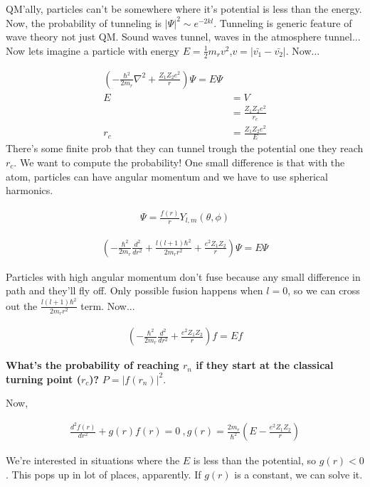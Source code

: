 \documentclass[10pt,letterpaper,final]{book}
\begin{document}
QM'ally, particles can't be somewhere where it's potential is less than the energy. Now, the probability of tunneling is $|\Psi|^2 \sim e^{-2kl}$. Tunneling is generic feature of wave theory not just QM. Sound waves tunnel, waves in the atmosphere tunnel...\\
Now lets imagine a particle with energy $E = \frac{1}{2}m_r v^2$,$v = | \bar{v_1} - \bar{v_2} |$. Now...

\begin{align}
\left( -\frac{\hbar^2}{2m_r}\nabla^2 + \frac{Z_1 Z_2 e^2}{r} \right) \Psi = E \Psi\\
E&=V\\
& = \frac{Z_1 Z_2 e^2}{r_c}\\
r_c &= \frac{Z_1 Z_2 e^2}{E}
\end{align}
There's some finite prob that they can tunnel trough the potential one they reach $r_c$. We want to compute the probability! One small difference is that with the atom, particles can have angular momentum and we have to use spherical harmonics.

\begin{align}
\Psi = \frac{f(r)}{r} Y_{l,m}(\theta,\phi)
\end{align}

\begin{align}
\left( -\frac{\hbar^2}{2m_r} \frac{d^2}{dr^2} + \frac{l(l+1)\hbar^2}{2m_r r^2} + \frac{e^2 Z_1 Z_2}{r} \right) \Psi = E \Psi
\end{align}

Particles with high angular momentum don't fuse because any small difference in path and they'll fly off. Only possible fusion happens when $l=0$, so we can cross out the $\frac{l(l+1)\hbar^2}{2m_r r^2} $ term. Now... 

\begin{align}
\left( -\frac{\hbar^2}{2m_r} \frac{d^2}{dr^2} +  \frac{e^2 Z_1 Z_2}{r} \right) f = Ef
\end{align}

\textbf{What's the probability of reaching $r_n$ if they start at the classical turning point ($r_c$)?} $P = | f(r_n)|^2$. 

Now, 

\begin{align}
\frac{d^2 f(r)}{dr^2} + g(r)f(r) = 0~,g(r) = \frac{2m_r}{\hbar^2} \left( E - \frac{e^2 Z_1 Z_2}{r} \right)
\end{align}

We're interested in situations where the $E$ is less than the potential, so $g(r) < 0$. This pops up in  lot of places, apparently. If $g(r)$ is a constant, we can solve it. 
\end{document}
